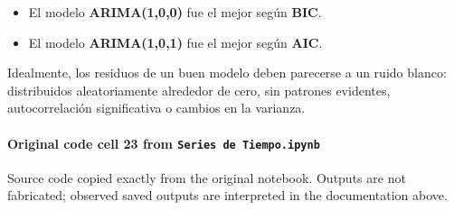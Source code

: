 \documentclass[
  11pt,
]{article}
\providecommand{\tightlist}{%
  \setlength{\itemsep}{0pt}\setlength{\parskip}{0pt}}
\begin{document}
\begin{itemize}
\tightlist
\item
  El modelo \textbf{ARIMA(1,0,0)} fue el \textquotesingle mejor\textquotesingle{} según \textbf{BIC}.
\item
  El modelo \textbf{ARIMA(1,0,1)} fue el \textquotesingle mejor\textquotesingle{} según \textbf{AIC}.
\end{itemize}

Idealmente, los residuos de un buen modelo deben parecerse a un ruido blanco: distribuidos aleatoriamente alrededor de cero, sin patrones evidentes, autocorrelación significativa o cambios en la varianza.

\paragraph{\texorpdfstring{Original code cell 23 from \texttt{Series\ de\ Tiempo.ipynb}}{Original code cell 23 from Series de Tiempo.ipynb}}\label{original-code-cell-23-from-series-de-tiempoipynb}

Source code copied exactly from the original notebook. Outputs are not fabricated; observed saved outputs are interpreted in the documentation above.
\end{document}
